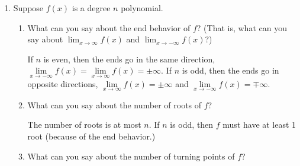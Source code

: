 \documentclass{article}
\begin{document}
\begin{enumerate}[resume, topsep=0pt]
\begin{enumerate}
  \end{enumerate}

\item  Suppose $f(x)$ is a degree $n$ polynomial.
  \begin{enumerate}

  \item
    \begin{problem}[\vfill]
      What can you say about the end behavior of $f$? (That is, what can you say about $\displaystyle \lim_{x \to \infty} f(x)$ and $\displaystyle \lim_{x \to -\infty} f(x)$?)
    \end{problem}

    \begin{solution}
      If $n$ is even, then the ends go in the same direction,
       $\lim\limits_{x\to-\infty} f(x) = \lim\limits_{x \to \infty} f(x)=
      \pm \infty$. If $n$ is odd, then the ends go in opposite directions,
      $\lim\limits_{x\to\infty} f(x)
      = \pm \infty$ and $\lim\limits_{x\to-\infty} f(x) = \mp \infty$.
      
      
    \end{solution}

  \item


    \begin{problem}[\vfill]
      What can you say about the number of roots of $f$?
    \end{problem}

    \begin{solution}
      The number of roots is at most $n$. If $n$ is odd, then
      $f$ must have at least 1 root (because of the end behavior.)
    \end{solution}

  \item


    \begin{problem}[\vfill]
      What can you say about the number of turning points of $f$?
    \end{problem}


\end{enumerate}
\end{enumerate}
\end{document}
